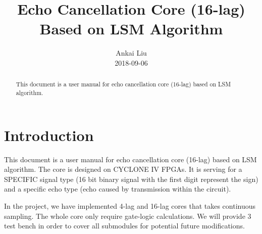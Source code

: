 \documentclass[twoside,a4paper]{refart}
\title{Echo Cancellation Core (16-lag) Based on LSM Algorithm}
\author{
Ankai Liu \\
2018-09-06
}
\date{}
\begin{document}
	
\graphicspath{ {image/} }
\maketitle
\begin{abstract}
	This document is a user manual for echo cancellation core (16-lag) based on LSM algorithm. 
\end{abstract}


\section{Introduction}
This document is a user manual for echo cancellation core (16-lag) based on LSM algorithm. The core is designed on CYCLONE IV FPGAs. It is serving for a SPECIFIC signal type (16 bit binary signal with the first digit represent the sign) and a specific echo type (echo caused by transmission within the circuit).

In the project, we have implemented 4-lag and 16-lag cores that takes continuous sampling. The whole core only require gate-logic calculations. We will provide 3 test bench in order to cover all submodules for potential future modifications. 

\end{document}
